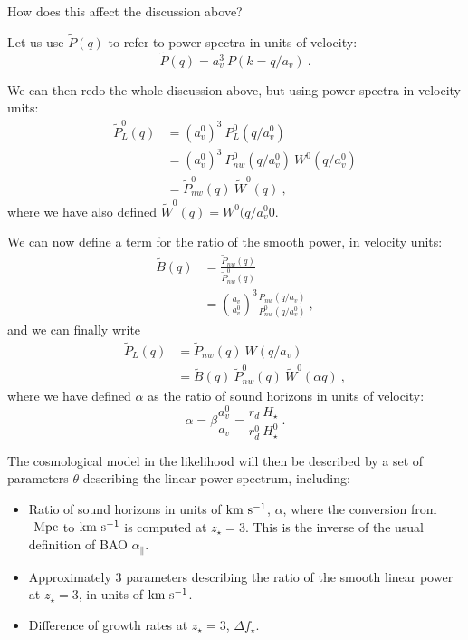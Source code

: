 How does this affect the discussion above?

Let us use $\tilde P(q)$ to refer to power spectra in units of velocity:
\begin{equation}
 \tilde P(q) = a_v^3 ~ P(k= q / a_v) ~.
\end{equation}

We can then redo the whole discussion above, but using power spectra in 
velocity units:
\begin{align} 
 \tilde P^0_L(q) & = (a^0_v)^3 ~ P^0_L(q / a^0_v)         \nonumber \\
   & = (a^0_v)^3 ~ P^0_{nw}(q / a^0_v) ~ W^0(q / a^0_v)      \nonumber \\
   & = \tilde P^0_{nw}(q) ~ \tilde W^0(q)  ~,
\end{align}
where we have also defined $\tilde W^0(q) = W^0(q / a^0_v0$.

We can now define a term for the ratio of the smooth power, in velocity
units:
\begin{align}
 \tilde B(q) & = \frac{\tilde P_{nw}(q)}{\tilde P^0_{nw}(q)}    \nonumber \\
  & = \left(\frac{a_v}{a_v^0}\right)^3 
      \frac{P_{nw}(q / a_v)}{P^0_{nw}(q / a_v^0)} ~,
\end{align}
and we can finally write 
\begin{align}
 \tilde P_L(q) & = \tilde P_{nw}(q) ~ W(q / a_v)                \nonumber \\
  & = \tilde B(q) ~ \tilde P^0_{nw}(q) ~ \tilde W^0(\alpha q) ~,
\end{align}
where we have defined $\alpha$ as the ratio of sound horizons in units of 
velocity: 
\begin{equation}
 \alpha = \beta \frac{a_v^0}{a_v} = \frac{r_d ~ H_\star}{r_d^0 ~ H^0_\star}~.
\end{equation}

The cosmological model in the likelihood will then be described by a 
set of parameters $\theta$ describing the linear power spectrum, including:
\begin{itemize}
 \item Ratio of sound horizons in units of ${\rm km~s^{-1}}$, $\alpha$, where the 
conversion from $\ \text{Mpc}$ to ${\rm km~s^{-1}}$ is computed at $z_\star=3$. 
This is the inverse of the usual definition of BAO $\alpha_\parallel$.
 \item Approximately 3 parameters describing the ratio of the smooth
  linear power at $z_\star=3$, in units of ${\rm km~s^{-1}}$.
 \item Difference of growth rates at $z_\star=3$, $\Delta f_\star$. 
\end{itemize}

